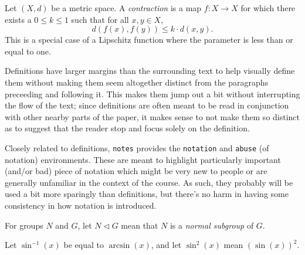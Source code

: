 \documentclass{notes}
\begin{document}
	\begin{definition}[Contraction]
		Let $(X,d)$ be a metric space. A \emph{contraction} is a map $f : X \to X$ for which there exists a $0 \leq k \leq 1$ such that for all $x,y \in X$,
		\[ d(f(x), f(y)) \leq k\cdot d(x,y). \]
		This is a special case of a Lipschitz function where the parameter is less than or equal to one.
	\end{definition}
	Definitions have larger margins than the surrounding text to help visually define them without making them seem altogether distinct from the paragraphs preceeding and following it.
	This makes them jump out a bit without interrupting the flow of the text; since definitions are often meant to be read in conjunction with other nearby parts of the paper, it makes sense to not make them so distinct as to suggest that the reader stop and focus solely on the definition.

	Closely related to definitions, \texttt{notes} provides the \texttt{notation} and \texttt{abuse} (of notation) environments.
	These are meant to highlight particularly important (and/or bad) piece of notation which might be very new to people or are generally unfamiliar in the context of the course.
	As such, they probably will be used a bit more sparingly than definitions, but there's no harm in having some consistency in how notation is introduced.
	\begin{notation}
		For groups $N$ and $G$, let $N \mathrel{\lhd} G$ mean that $N$ is a \emph{normal subgroup} of $G$.
	\end{notation}
	\begin{abuse}
		Let $\sin^{-1}(x)$ be equal to $\arcsin(x)$, and let $\sin^2(x)$ mean $(\sin(x))^2$. 
	\end{abuse}
\end{document}
